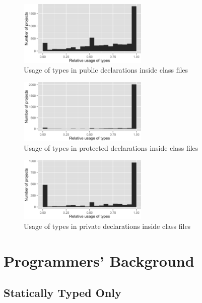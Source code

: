 \begin{figure}[h]
\centering 
\includegraphics[width=0.55\textwidth]{../aosd_2014/analysis/result/script/class/histograms/13_Public.png} 
\caption{Usage of types in public declarations inside class files}
\end{figure}

\begin{figure}[h]
\centering 
\includegraphics[width=0.55\textwidth]{../aosd_2014/analysis/result/script/class/histograms/12_Protected.png} 
\caption{Usage of types in protected declarations inside class files}
\end{figure}

\begin{figure}[h]
\centering 
\includegraphics[width=0.55\textwidth]{../aosd_2014/analysis/result/script/class/histograms/11_Private.png} 
\caption{Usage of types in private declarations inside class files}
\end{figure}

\FloatBarrier
\section{Programmers' Background\label{a:background}}

\subsection*{Statically Typed Only}

